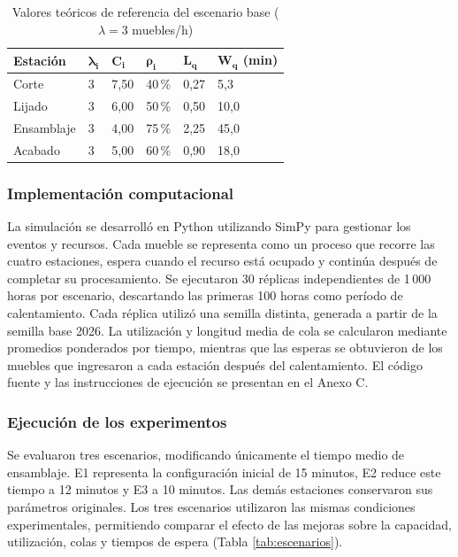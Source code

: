 \documentclass[conference,a4paper]{IEEEtran}
\newcommand{\tablabase}{\renewcommand{\arraystretch}{1.1}\setlength{\tabcolsep}{2.5pt}}
\begin{document}
\begin{table}[!t]
\caption{Valores teóricos de referencia del escenario base ($\lambda = 3$ muebles/h)}
\label{tab:teoricos}
\centering
\footnotesize
\tablabase
\begin{tabular}{|L{1.8cm}|C{0.8cm}|C{1.2cm}|C{1.2cm}|C{1.2cm}|C{1.4cm}|}
\hline
\textbf{Estación} & $\boldsymbol{\lambda_i}$ & $\boldsymbol{C_i}$ & $\boldsymbol{\rho_i}$ &
$\boldsymbol{L_q}$ & $\boldsymbol{W_q}$ (min) \\ \hline
Corte & 3 & 7,50 & 40\,\% & 0,27 & 5,3 \\ \hline
Lijado & 3 & 6,00 & 50\,\% & 0,50 & 10,0 \\ \hline
Ensamblaje & 3 & 4,00 & 75\,\% & 2,25 & 45,0 \\ \hline
Acabado & 3 & 5,00 & 60\,\% & 0,90 & 18,0 \\ \hline
\end{tabular}
\end{table}

\subsubsection{Implementación computacional}
La simulación se desarrolló en Python utilizando SimPy para gestionar los eventos y recursos.
Cada mueble se representa como un proceso que recorre las cuatro estaciones, espera cuando el
recurso está ocupado y continúa después de completar su procesamiento. Se ejecutaron 30
réplicas independientes de 1\,000 horas por escenario, descartando las primeras 100 horas
como período de calentamiento. Cada réplica utilizó una semilla distinta, generada a partir
de la semilla base 2026. La utilización y longitud media de cola se calcularon mediante
promedios ponderados por tiempo, mientras que las esperas se obtuvieron de los muebles que
ingresaron a cada estación después del calentamiento. El código fuente y las instrucciones de
ejecución se presentan en el Anexo C.

\subsubsection{Ejecución de los experimentos}
Se evaluaron tres escenarios, modificando únicamente el tiempo medio de ensamblaje. E1
representa la configuración inicial de 15 minutos, E2 reduce este tiempo a 12 minutos y E3 a
10 minutos. Las demás estaciones conservaron sus parámetros originales. Los tres escenarios
utilizaron las mismas condiciones experimentales, permitiendo comparar el efecto de las
mejoras sobre la capacidad, utilización, colas y tiempos de espera (Tabla \ref{tab:escenarios}).
\end{document}
